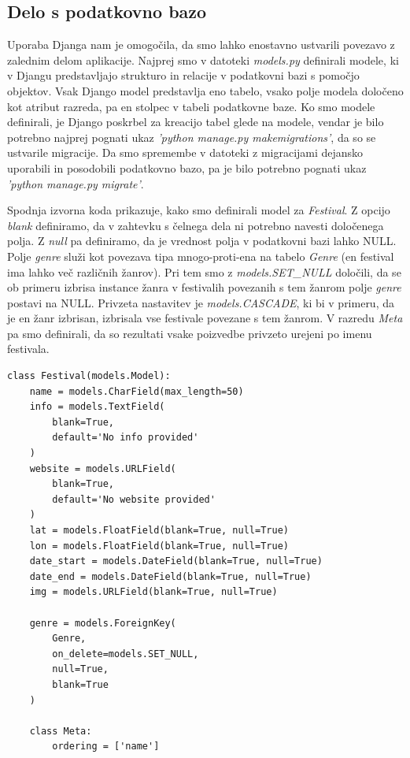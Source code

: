 \documentclass[a4paper,12pt,openright]{book}
\begin{document}
\subsection{Delo s podatkovno bazo}
Uporaba Djanga nam je omogočila, da smo lahko enostavno ustvarili povezavo z zalednim delom aplikacije.
Najprej smo v datoteki \textit{models.py} definirali modele, ki v Djangu predstavljajo strukturo in relacije v podatkovni bazi s pomočjo objektov.
Vsak Django model predstavlja eno tabelo, vsako polje modela določeno kot atribut razreda, pa en stolpec v tabeli podatkovne baze.
Ko smo modele definirali, je Django poskrbel za kreacijo tabel glede na modele, vendar je bilo potrebno najprej pognati ukaz \textit{'python manage.py makemigrations'}, da so se ustvarile migracije.
Da smo spremembe v datoteki z migracijami dejansko uporabili in posodobili podatkovno bazo, pa je bilo potrebno pognati ukaz \textit{'python manage.py migrate'}.

Spodnja izvorna koda prikazuje, kako smo definirali model za \textit{Festival}.
Z opcijo \textit{blank} definiramo, da v zahtevku s čelnega dela ni potrebno navesti določenega polja.
Z \textit{null} pa definiramo, da je vrednost polja v podatkovni bazi lahko NULL.
Polje \textit{genre} služi kot povezava tipa mnogo-proti-ena na tabelo \textit{Genre} (en festival ima lahko več različnih žanrov).
Pri tem smo z \textit{models.SET\_NULL} določili, da se ob primeru izbrisa instance žanra v festivalih povezanih s tem žanrom polje \textit{genre} postavi na NULL.
Privzeta nastavitev je \textit{models.CASCADE}, ki bi v primeru, da je en žanr izbrisan, izbrisala vse festivale povezane s tem žanrom.
V razredu \textit{Meta} pa smo definirali, da so rezultati vsake poizvedbe privzeto urejeni po imenu festivala.

\begin{lstlisting}[label=code1,caption=Primer kreiranja modela Festival v Djangu.,frame=tb,captionpos=b]
class Festival(models.Model):
    name = models.CharField(max_length=50)
    info = models.TextField(
        blank=True, 
        default='No info provided'
    )
    website = models.URLField(
        blank=True,
        default='No website provided'
    )
    lat = models.FloatField(blank=True, null=True)
    lon = models.FloatField(blank=True, null=True)
    date_start = models.DateField(blank=True, null=True)
    date_end = models.DateField(blank=True, null=True)
    img = models.URLField(blank=True, null=True)
    
    genre = models.ForeignKey(
        Genre, 
        on_delete=models.SET_NULL, 
        null=True, 
        blank=True
    )

    class Meta:
        ordering = ['name']
\end{lstlisting}
\end{document}
